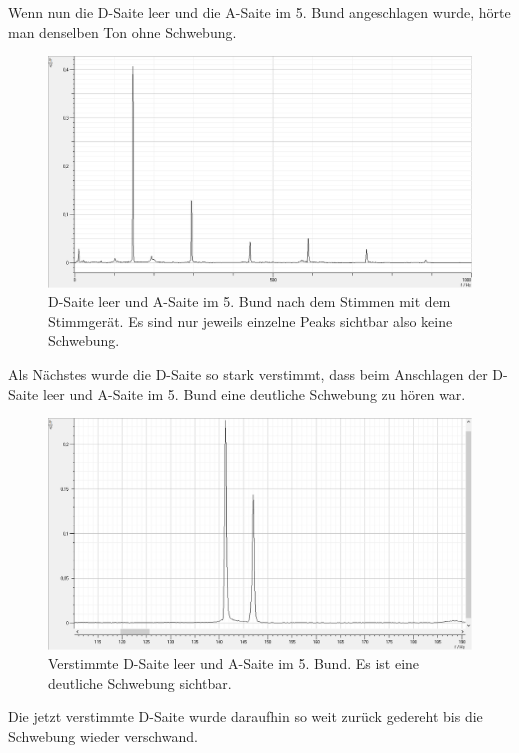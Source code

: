 \documentclass[12pt,a4paper]{article}
\begin{document}
Wenn nun die D-Saite leer und die A-Saite im 5. Bund angeschlagen wurde, hörte man denselben Ton ohne Schwebung.

\begin{figure}[H]
\centering
\includegraphics[scale=0.5]{Bilder/Gestimmt_Vorher.png}
\caption{D-Saite leer und A-Saite im 5. Bund nach dem Stimmen mit dem Stimmgerät. Es sind nur jeweils einzelne Peaks sichtbar also keine Schwebung.}
\end{figure}

Als Nächstes wurde die D-Saite so stark verstimmt, dass beim Anschlagen der D-Saite leer und A-Saite im 5. Bund eine deutliche Schwebung zu hören war.

\begin{figure}[H]
\centering
\includegraphics[scale=0.5]{Bilder/Verstimmt.png}
\caption{Verstimmte D-Saite leer und A-Saite im 5. Bund. Es ist eine deutliche Schwebung sichtbar.}
\end{figure}

Die jetzt verstimmte D-Saite wurde daraufhin so weit zurück gedereht bis die Schwebung wieder verschwand.
\end{document}
